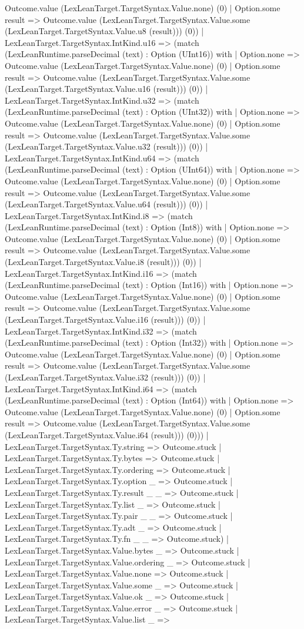 \documentclass[11pt]{article}
\begin{document}
Outcome.value (LexLeanTarget.TargetSyntax.Value.none) (0) | Option.some result => Outcome.value (LexLeanTarget.TargetSyntax.Value.some (LexLeanTarget.TargetSyntax.Value.u8 (result))) (0)) | LexLeanTarget.TargetSyntax.IntKind.u16 => (match (LexLeanRuntime.parseDecimal (text) : Option (UInt16)) with | Option.none => Outcome.value (LexLeanTarget.TargetSyntax.Value.none) (0) | Option.some result => Outcome.value (LexLeanTarget.TargetSyntax.Value.some (LexLeanTarget.TargetSyntax.Value.u16 (result))) (0)) | LexLeanTarget.TargetSyntax.IntKind.u32 => (match (LexLeanRuntime.parseDecimal (text) : Option (UInt32)) with | Option.none => Outcome.value (LexLeanTarget.TargetSyntax.Value.none) (0) | Option.some result => Outcome.value (LexLeanTarget.TargetSyntax.Value.some (LexLeanTarget.TargetSyntax.Value.u32 (result))) (0)) | LexLeanTarget.TargetSyntax.IntKind.u64 => (match (LexLeanRuntime.parseDecimal (text) : Option (UInt64)) with | Option.none => Outcome.value (LexLeanTarget.TargetSyntax.Value.none) (0) | Option.some result => Outcome.value (LexLeanTarget.TargetSyntax.Value.some (LexLeanTarget.TargetSyntax.Value.u64 (result))) (0)) | LexLeanTarget.TargetSyntax.IntKind.i8 => (match (LexLeanRuntime.parseDecimal (text) : Option (Int8)) with | Option.none => Outcome.value (LexLeanTarget.TargetSyntax.Value.none) (0) | Option.some result => Outcome.value (LexLeanTarget.TargetSyntax.Value.some (LexLeanTarget.TargetSyntax.Value.i8 (result))) (0)) | LexLeanTarget.TargetSyntax.IntKind.i16 => (match (LexLeanRuntime.parseDecimal (text) : Option (Int16)) with | Option.none => Outcome.value (LexLeanTarget.TargetSyntax.Value.none) (0) | Option.some result => Outcome.value (LexLeanTarget.TargetSyntax.Value.some (LexLeanTarget.TargetSyntax.Value.i16 (result))) (0)) | LexLeanTarget.TargetSyntax.IntKind.i32 => (match (LexLeanRuntime.parseDecimal (text) : Option (Int32)) with | Option.none => Outcome.value (LexLeanTarget.TargetSyntax.Value.none) (0) | Option.some result => Outcome.value (LexLeanTarget.TargetSyntax.Value.some (LexLeanTarget.TargetSyntax.Value.i32 (result))) (0)) | LexLeanTarget.TargetSyntax.IntKind.i64 => (match (LexLeanRuntime.parseDecimal (text) : Option (Int64)) with | Option.none => Outcome.value (LexLeanTarget.TargetSyntax.Value.none) (0) | Option.some result => Outcome.value (LexLeanTarget.TargetSyntax.Value.some (LexLeanTarget.TargetSyntax.Value.i64 (result))) (0))) | LexLeanTarget.TargetSyntax.Ty.string => Outcome.stuck | LexLeanTarget.TargetSyntax.Ty.bytes => Outcome.stuck | LexLeanTarget.TargetSyntax.Ty.ordering => Outcome.stuck | LexLeanTarget.TargetSyntax.Ty.option \_ => Outcome.stuck | LexLeanTarget.TargetSyntax.Ty.result \_ \_ => Outcome.stuck | LexLeanTarget.TargetSyntax.Ty.list \_ => Outcome.stuck | LexLeanTarget.TargetSyntax.Ty.pair \_ \_ => Outcome.stuck | LexLeanTarget.TargetSyntax.Ty.adt \_ => Outcome.stuck | LexLeanTarget.TargetSyntax.Ty.fn \_ \_ => Outcome.stuck) | LexLeanTarget.TargetSyntax.Value.bytes \_ => Outcome.stuck | LexLeanTarget.TargetSyntax.Value.ordering \_ => Outcome.stuck | LexLeanTarget.TargetSyntax.Value.none => Outcome.stuck | LexLeanTarget.TargetSyntax.Value.some \_ => Outcome.stuck | LexLeanTarget.TargetSyntax.Value.ok \_ => Outcome.stuck | LexLeanTarget.TargetSyntax.Value.error \_ => Outcome.stuck | LexLeanTarget.TargetSyntax.Value.list \_ => 
\end{document}
